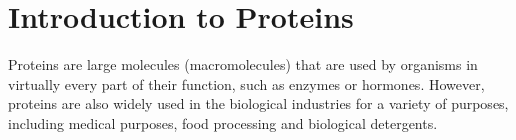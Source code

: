 
\section{Introduction to Proteins}
Proteins are large molecules (macromolecules) that are used by organisms in virtually every part of their function, such as enzymes or hormones. However, proteins are also widely used in the biological industries for a variety of purposes, including medical purposes, food processing and biological detergents. %



